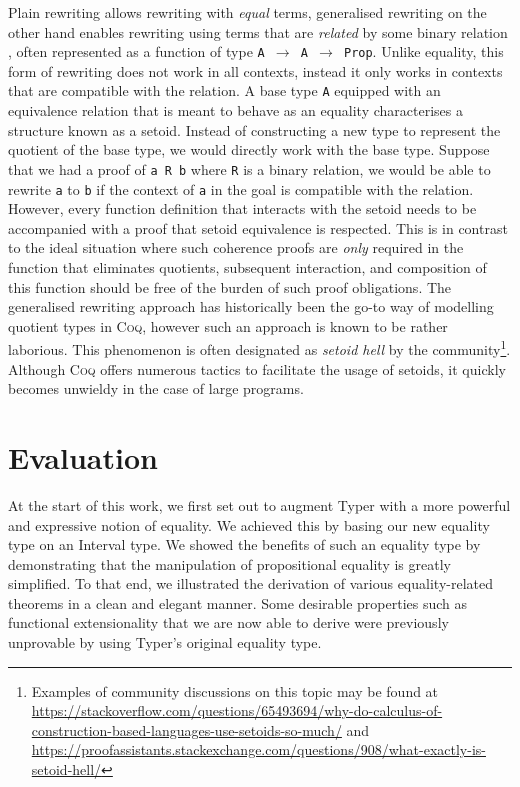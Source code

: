 \documentclass[12pt,twoside,maitrise]{dms}
\theoremstyle{definition}
\numberwithin{equation}{section}
\numberwithin{table}{chapter}
\numberwithin{figure}{chapter}
\newcommand\kw[1] {\textsf{#1}}
\newcommand\id[1] {\texttt{#1}}
\newcommand\fn[1] {\texttt{#1}}
\def\Coq{\textsc{Coq}\xspace}
\begin{document}
Plain rewriting allows rewriting with \emph{equal} terms, generalised
rewriting\cite{sozeau2009new, coq-gen-rewriting} on the other hand enables
rewriting using terms that are \emph{related} by some binary relation , often
represented as a function of type \fn{A $\rightarrow$ A $\rightarrow$
  \kw{Prop}}. Unlike equality, this form of rewriting does not work in all
contexts, instead it only works in contexts that are compatible with the
relation. A base type \id{A} equipped with an equivalence relation that is meant
to behave as an equality characterises a structure known as a
setoid\cite{hofmann1995simple}. Instead of constructing a new type to represent
the quotient of the base type, we would directly work with the base type.
Suppose that we had a proof of \fn{a R b} where \id{R} is a binary relation, we
would be able to rewrite \id{a} to \id{b} if the context of \id{a} in the goal
is compatible with the relation. However, every function definition that
interacts with the setoid needs to be accompanied with a proof that setoid
equivalence is respected. This is in contrast to the ideal situation where such
coherence proofs are \emph{only} required in the function that eliminates
quotients, subsequent interaction, and composition of this function should be
free of the burden of such proof obligations. The generalised rewriting approach
has historically been the go-to way of modelling quotient types in \Coq{},
however such an approach is known to be rather laborious. This phenomenon is
often designated as \emph{setoid hell} by the community\footnote{Examples of
community discussions on this topic may be found at
\url{https://stackoverflow.com/questions/65493694/why-do-calculus-of-construction-based-languages-use-setoids-so-much/}
and
\url{https://proofassistants.stackexchange.com/questions/908/what-exactly-is-setoid-hell/}}.
Although \Coq{} offers numerous tactics to facilitate the usage of setoids, it
quickly becomes unwieldy in the case of large programs.

\chapter{Evaluation}

At the start of this work, we first set out to augment Typer with a more
powerful and expressive notion of equality. We achieved this by basing our new
equality type on an Interval type. We showed the benefits of such an equality
type by demonstrating that the manipulation of propositional equality is greatly
simplified. To that end, we illustrated the derivation of various
equality-related theorems in a clean and elegant manner. Some desirable
properties such as functional extensionality that we are now able to derive were
previously unprovable by using Typer's original equality type.
\end{document}
